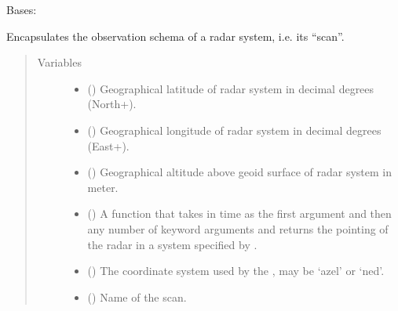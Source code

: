 \documentclass[letterpaper,10pt,english]{sphinxmanual}
\begin{document}
\begin{fulllineitems}
\label{\detokenize{modules/radar_scans:radar_scans.RadarScan}}
Bases: 

Encapsulates the observation schema of a radar system, i.e. its “scan”.
\begin{quote}\begin{description}
\item[{Variables}] \leavevmode\begin{itemize}
\item {} 
 () \textendash{} Geographical latitude of radar system in decimal degrees  (North+).

\item {} 
 () \textendash{} Geographical longitude of radar system in decimal degrees (East+).

\item {} 
 () \textendash{} Geographical altitude above geoid surface of radar system in meter.

\item {} 
 () \textendash{} A function that takes in time as the first argument and then any number of keyword arguments and returns the pointing of the radar in a system specified by .

\item {} 
 () \textendash{} The coordinate system used by the , may be ‘azel’ or ‘ned’.

\item {} 
 () \textendash{} Name of the scan.


\end{itemize}
\end{description}
\end{quote}
\end{fulllineitems}
\end{document}
